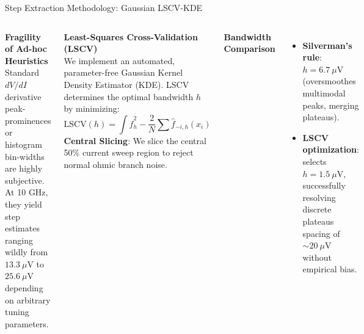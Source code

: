\documentclass[aspectratio=169]{beamer}
\begin{document}
\begin{frame}{Step Extraction Methodology: Gaussian LSCV-KDE}
    \begin{columns}
        \textbf{Fragility of Ad-hoc Heuristics} \\
        \small Standard $dV/dI$ derivative peak-prominences or histogram bin-widths are highly subjective. At 10 GHz, they yield step estimates ranging wildly from $13.3\ \mu\text{V}$ to $25.6\ \mu\text{V}$ depending on arbitrary tuning parameters.
        
        \vspace{0.1cm}
        \textbf{Least-Squares Cross-Validation (LSCV)} \\
        \small We implement an automated, parameter-free Gaussian Kernel Density Estimator (KDE). LSCV determines the optimal bandwidth $h$ by minimizing:
        \begin{equation}
            \text{LSCV}(h) = \int \hat{f}_h^2 - \frac{2}{N}\sum \hat{f}_{-i,h}(x_i)
        \end{equation}
        \textbf{Central Slicing}: We slice the central 50\% current sweep region to reject normal ohmic branch noise.
        
        \textbf{Bandwidth Comparison} \\
        \begin{itemize}
            \item \textbf{Silverman's rule}: $h = 6.7\ \mu\text{V}$ (oversmoothes multimodal peaks, merging plateaus).
            \item \textbf{LSCV optimization}: selects $h = 1.5\ \mu\text{V}$, successfully resolving discrete plateaus spacing of $\sim 20\ \mu\text{V}$ without empirical bias.
        \end{itemize}
    \end{columns}
\end{frame}
\end{document}
